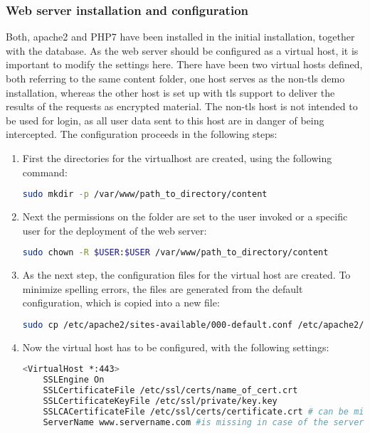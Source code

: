 \subsubsection{Web server installation and configuration}
Both, apache2 and PHP7 have been installed in the initial installation, together with the database. As the web server should be configured as a virtual host, it is important to 
modify the settings here. There have been two virtual hosts defined, both referring to the same content folder, one host serves as the non-tls demo installation, whereas the other
host is set up with tls support to deliver the results of the requests as encrypted material. The non-tls host is not intended to be used for login, as all user data sent to this 
host are in danger of being intercepted. The configuration proceeds in the following steps:
\begin{enumerate}
 \item First the directories for the virtualhost are created, using the following command:
 \begin{lstlisting}[language=bash]
  sudo mkdir -p /var/www/path_to_directory/content
 \end{lstlisting}
 \item Next the permissions on the folder are set to the user invoked or a specific user for the deployment of the web server:
 \begin{lstlisting}[language=bash]
  sudo chown -R $USER:$USER /var/www/path_to_directory/content
 \end{lstlisting}
 \item As the next step, the configuration files for the virtual host are created. To minimize spelling errors, the files are generated from the default configuration, which is 
 copied into a new file:
 \begin{lstlisting}[language=bash]
  sudo cp /etc/apache2/sites-available/000-default.conf /etc/apache2/sites-available/name_virtual_host.conf
 \end{lstlisting}
 \item Now the virtual host has to be configured, with the following settings:
 \begin{lstlisting}[language=bash]
  <VirtualHost *:443>
	SSLEngine On
	SSLCertificateFile /etc/ssl/certs/name_of_cert.crt
	SSLCertificateKeyFile /etc/ssl/private/key.key
	SSLCACertificateFile /etc/ssl/certs/certificate.crt # can be missing, depending on tls configuration of the server
	ServerName www.servername.com #is missing in case of the server, to allow host resolution to the default virtual host and avoid DNS conflicts

\end{lstlisting}
\end{enumerate}
